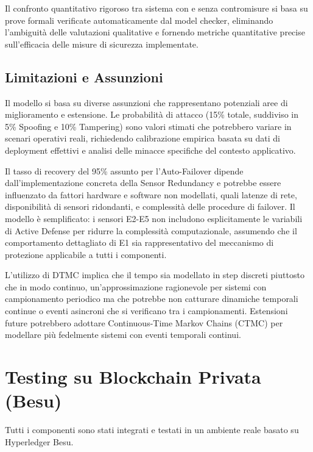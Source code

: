 Il confronto quantitativo rigoroso tra sistema con e senza contromisure si basa su prove formali verificate automaticamente dal model checker, eliminando l'ambiguità delle valutazioni qualitative e fornendo metriche quantitative precise sull'efficacia delle misure di sicurezza implementate.

\subsection{Limitazioni e Assunzioni}
Il modello si basa su diverse assunzioni che rappresentano potenziali aree di miglioramento e estensione. Le probabilità di attacco (15\% totale, suddiviso in 5\% Spoofing e 10\% Tampering) sono valori stimati che potrebbero variare in scenari operativi reali, richiedendo calibrazione empirica basata su dati di deployment effettivi e analisi delle minacce specifiche del contesto applicativo.

Il tasso di recovery del 95\% assunto per l'Auto-Failover dipende dall'implementazione concreta della Sensor Redundancy e potrebbe essere influenzato da fattori hardware e software non modellati, quali latenze di rete, disponibilità di sensori ridondanti, e complessità delle procedure di failover. Il modello è semplificato: i sensori E2-E5 non includono esplicitamente le variabili di Active Defense per ridurre la complessità computazionale, assumendo che il comportamento dettagliato di E1 sia rappresentativo del meccanismo di protezione applicabile a tutti i componenti.

L'utilizzo di DTMC implica che il tempo sia modellato in step discreti piuttosto che in modo continuo, un'approssimazione ragionevole per sistemi con campionamento periodico ma che potrebbe non catturare dinamiche temporali continue o eventi asincroni che si verificano tra i campionamenti. Estensioni future potrebbero adottare Continuous-Time Markov Chains (CTMC) per modellare più fedelmente sistemi con eventi temporali continui.

\section{Testing su Blockchain Privata (Besu)}

Tutti i componenti sono stati integrati e testati in un ambiente reale basato su Hyperledger Besu.

